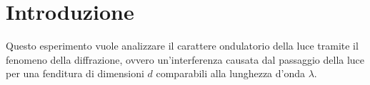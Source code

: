 \documentclass[../main.tex]{subfiles}
\begin{document}
\section{Introduzione}

Questo esperimento vuole analizzare il carattere ondulatorio della luce tramite il fenomeno della diffrazione, ovvero un'interferenza causata dal passaggio della luce per una fenditura di dimensioni $d$ comparabili alla lunghezza d'onda $\lambda$.
\end{document}
